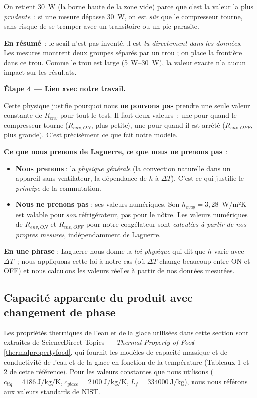 \documentclass[11pt,a4paper]{article}
\begin{document}
On retient \SI{30}{\watt} (la borne haute de la zone vide) parce que c'est la valeur la
plus \emph{prudente}~: si une mesure dépasse \SI{30}{\watt}, on est \emph{sûr} que le
compresseur tourne, sans risque de se tromper avec un transitoire ou un pic parasite.

\textbf{En résumé}~: le seuil n'est pas inventé, il est \emph{lu directement dans les
données}. Les mesures montrent deux groupes séparés par un trou ; on place la frontière
dans ce trou. Comme le trou est large (\SI{5}{\watt}--\SI{30}{\watt}), la valeur exacte
n'a aucun impact sur les résultats.

\medskip
\textbf{Étape 4 — Lien avec notre travail.}

Cette physique justifie pourquoi nous \textbf{ne pouvons pas} prendre une seule valeur
constante de $R_{env}$ pour tout le test. Il faut deux valeurs~: une pour quand le
compresseur tourne ($R_{env,ON}$, plus petite), une pour quand il est arrêté
($R_{env,OFF}$, plus grande). C'est précisément ce que fait notre modèle.

\medskip
\textbf{Ce que nous prenons de Laguerre, ce que nous ne prenons pas}~:
\begin{itemize}[itemsep=2pt]
\item \textbf{Nous prenons} : la \emph{physique générale} (la convection naturelle dans un
appareil sans ventilateur, la dépendance de $h$ à $\Delta T$). C'est ce qui justifie le
\emph{principe} de la commutation.
\item \textbf{Nous ne prenons pas} : ses valeurs numériques. Son $h_{evap} = 3{,}28$~W/m²K
est valable pour \emph{son} réfrigérateur, pas pour le nôtre. Les valeurs numériques de
$R_{env,ON}$ et $R_{env,OFF}$ pour notre congélateur sont \emph{calculées à partir de nos
propres mesures}, indépendamment de Laguerre.
\end{itemize}

\textbf{En une phrase} : Laguerre nous donne la \emph{loi physique} qui dit que $h$ varie
avec $\Delta T$~; nous appliquons cette loi à notre cas (où $\Delta T$ change beaucoup
entre ON et OFF) et nous calculons les valeurs réelles à partir de nos données mesurées.

\subsection{Capacité apparente du produit avec changement de phase}\label{sec:cprod}

Les propriétés thermiques de l'eau et de la glace utilisées dans cette section sont
extraites de ScienceDirect Topics — \emph{Thermal Property of Food}
\ref{thermalpropertyfood}, qui fournit les modèles de capacité massique et de
conductivité de l'eau et de la glace en fonction de la température (Tableaux 1 et 2 de
cette référence). Pour les valeurs constantes que nous utilisons ($c_{liq} = \SI{4186}
{\joule\per\kilogram\per\kelvin}$, $c_{glace} = \SI{2100}{\joule\per\kilogram\per\kelvin}$,
$L_f = \SI{334000}{\joule\per\kilogram}$), nous nous référons aux valeurs standards de
NIST.
\end{document}
